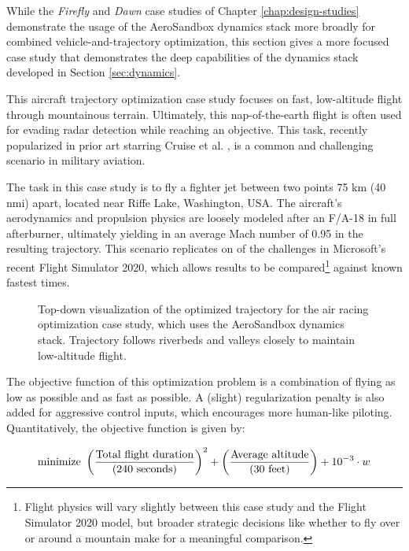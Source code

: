 While the \emph{Firefly} and \emph{Dawn} case studies of Chapter \ref{chap:design-studies} demonstrate the usage of the AeroSandbox dynamics stack more broadly for combined vehicle-and-trajectory optimization, this section gives a more focused case study that demonstrates the deep capabilities of the dynamics stack developed in Section \ref{sec:dynamics}.

This aircraft trajectory optimization case study focuses on fast, low-altitude flight through mountainous terrain. Ultimately, this nap-of-the-earth flight is often used for evading radar detection while reaching an objective. This task, recently popularized in prior art starring Cruise et al. \cite{topgunmaverick2022}, is a common and challenging scenario in military aviation.

The task in this case study is to fly a fighter jet between two points 75 km (40 nmi) apart, located near Riffe Lake, Washington, USA. The aircraft's aerodynamics and propulsion physics are loosely modeled after an F/A-18 in full afterburner, ultimately yielding in an average Mach number of 0.95 in the resulting trajectory. This scenario replicates on of the challenges in Microsoft's recent Flight Simulator 2020, which allows results to be compared\footnote{Flight physics will vary slightly between this case study and the Flight Simulator 2020 model, but broader strategic decisions like whether to fly over or around a mountain make for a meaningful comparison.} against known fastest times.

\begin{figure}[h]
    \centering
    
    \caption{Top-down visualization of the optimized trajectory for the air racing optimization case study, which uses the AeroSandbox dynamics stack. Trajectory follows riverbeds and valleys closely to maintain low-altitude flight.}
    \label{fig:air-racing-trajectory}
\end{figure}

The objective function of this optimization problem is a combination of flying as low as possible and as fast as possible. A (slight) regularization penalty is also added for aggressive control inputs, which encourages more human-like piloting. Quantitatively, the objective function is given by:

\begin{equation}
    \text{minimize }
    \left(
    \frac
    {\text{Total flight duration}}
    {({240\ \rm seconds})}
    \right)^2 +
    \left(
    \frac
    {\text{Average altitude}}
    {({30\ \rm feet})}
    \right) +
    10^{-3} \cdot w
\end{equation}

